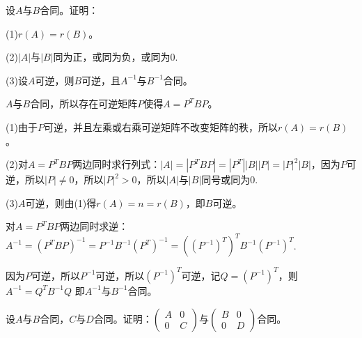 \documentclass[a4paper]{report}
\begin{document}
\hphantom{~~}

\EX 设$A$与$B$合同。证明：

(1)$r(A)=r(B)$。

(2)$|A|$与$|B|$同为正，或同为负，或同为0.

(3)设$A$可逆，则$B$可逆，且$A^{-1}$与$B^{-1}$合同。

\begin{zhengming}
$A$与$B$合同，所以存在可逆矩阵$P$使得$A=P^TBP$。

(1)由于$P$可逆，并且左乘或右乘可逆矩阵不改变矩阵的秩，所以$r(A)=r(B)$。

(2)对$A=P^TBP$两边同时求行列式：$|A|=|P^TBP|=|P^T||B||P|=|P|^2|B|$，因为$P$可逆，所以$|P|\neq 0$，所以$|P|^2>0$，所以$|A|$与$|B|$同号或同为0.

(3)$A$可逆，则由(1)得$r(A)=n=r(B)$，即$B$可逆。

对$A=P^TBP$两边同时求逆：$A^{-1}=(P^TBP)^{-1}=P^{-1}B^{-1}(P^{T})^{-1}=((P^{-1})^T)^TB^{-1}(P^{-1})^{T}$.

因为$P$可逆，所以$P^{-1}$可逆，所以$(P^{-1})^T$可逆，记$Q=(P^{-1})^T$，则$A^{-1}=Q^TB^{-1}Q$
即$A^{-1}$与$B^{-1}$合同。
\end{zhengming}

\EX 设$A$与$B$合同，$C$与$D$合同。证明：$
\begin{pmatrix}
A&0\\
0&C
\end{pmatrix}
$与$\begin{pmatrix}
B&0\\
0&D
\end{pmatrix}
$合同。
\end{document}
